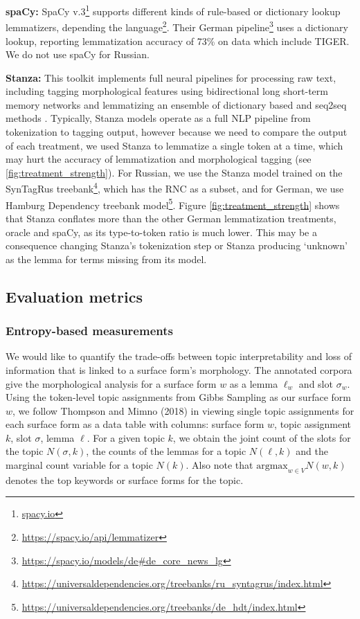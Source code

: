 \documentclass[11pt,a4paper]{article}
\newcommand{\argmax}{\mathrm{argmax}}
\begin{document}
\textbf{spaCy:} SpaCy v.3\footnote{\url{spacy.io}} supports different kinds of rule-based or dictionary lookup lemmatizers, depending the language\footnote{\url{https://spacy.io/api/lemmatizer}}. Their German pipeline\footnote{\url{https://spacy.io/models/de\#de\_core\_news\_lg}} uses a dictionary lookup, reporting lemmatization accuracy of 73\% on data which include TIGER. We do not use spaCy for Russian.


\textbf{Stanza:} This toolkit implements full neural pipelines for processing raw text, including tagging morphological features using bidirectional long short-term memory networks and lemmatizing an ensemble of dictionary based and seq2seq methods \cite{qi2020stanza}. Typically, Stanza models operate as a full NLP pipeline from tokenization to tagging output, however because we need to compare the output of each treatment, we used Stanza to lemmatize a single token at a time, which may hurt the accuracy of lemmatization and morphological tagging (see \ref{fig:treatment_strength}). For Russian, we use the Stanza model trained on the SynTagRus treebank\footnote{\url{https://universaldependencies.org/treebanks/ru_syntagrus/index.html}}, which has the RNC as a subset, and for German, we use Hamburg Dependency treebank model\footnote{\url{https://universaldependencies.org/treebanks/de_hdt/index.html}}. Figure \ref{fig:treatment_strength} shows that Stanza conflates more than the other German lemmatization treatments, oracle and spaCy, as its type-to-token ratio is much lower. This may be a consequence changing Stanza's tokenization step or Stanza producing `unknown' as the lemma for terms missing from its model.

\subsection{Evaluation metrics}

\subsubsection{Entropy-based measurements}
We would like to quantify the trade-offs between topic interpretability and loss of information that is linked to a surface form's morphology. The annotated corpora give the morphological analysis for a surface form $w$ as a lemma $\ell_w$ and slot $\sigma_w$. Using the token-level topic assignments from Gibbs Sampling as our surface form $w$, we follow Thompson and Mimno (2018) in viewing single topic assignments for each surface form as a data table with columns: surface form $w$, topic assignment $k$, slot $\sigma$, lemma $\ell$. For a given topic $k$, we obtain the joint count of the slots for the topic $N(\sigma, k)$, the counts of the lemmas for a topic $N(\ell, k)$ and the marginal count variable for a topic $N(k)$. Also note that $\argmax_{w \in V} N(w, k)$ denotes the top keywords or surface forms for the topic.
\end{document}
